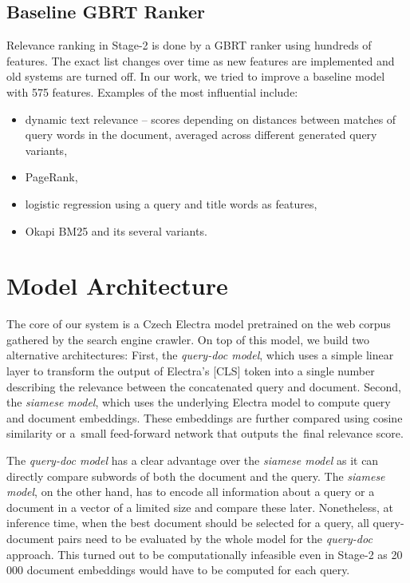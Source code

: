 \documentclass[letterpaper]{article} \usepackage{aaai22 }  \usepackage{times}  \usepackage{helvet}  \usepackage{courier}  \usepackage[hyphens]{url}  \usepackage{graphicx} \usepackage{amsmath,amsfonts,amssymb, mathabx,bm,bbm}
\begin{document}
\subsection{Baseline GBRT Ranker}
Relevance ranking in Stage-2 is done by a GBRT ranker using hundreds of features. The exact list changes over time as new features are implemented and old systems are turned off. In our work, we tried to improve a baseline model with 575 features. Examples of the most influential include:

\begin{itemize}
    \item dynamic text relevance -- scores depending on distances between matches of query words in the document, averaged across different generated query variants,
    \item PageRank,
    \item logistic regression using a query and title words as features,
    \item Okapi BM25 and its several variants.
\end{itemize}

\section{Model Architecture}\label{sec:model_architecture}

The core of our system is a Czech Electra model pretrained on the web corpus gathered by the search engine crawler. On top of this model, we build two alternative architectures: First, the \emph{query-doc model}, which uses a simple linear layer to transform the output of Electra's [CLS] token into a single number describing the relevance between the concatenated query and document. Second, the \textit{siamese model}, which uses the underlying Electra model to compute query and document embeddings. These embeddings are further compared using cosine similarity or a~small feed-forward network that outputs the~final relevance score.

The \textit{query-doc model} has a clear advantage over the \emph{siamese model} as it can directly compare subwords of both the document and the query. The \emph{siamese model}, on the other hand, has to encode all information about a query or a document in a vector of a limited size and compare these later. Nonetheless, at inference time, when the best document should be selected for a query, all query-document pairs need to be evaluated by the whole model for the \textit{query-doc} approach. This turned out to be computationally infeasible even in Stage-2 as 20\,000 document embeddings would have to be computed for each query.
\end{document}

